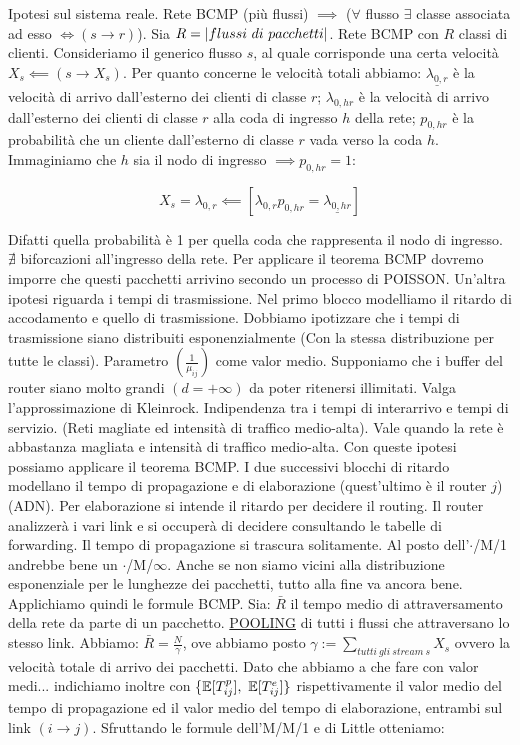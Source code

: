 Ipotesi sul sistema reale. Rete BCMP (più flussi) $\implies$ ($\forall$ flusso $\exists$ classe associata ad esso $\iff (s\rightarrow r)$). Sia $R=\cardinality{flussi\ di\ pacchetti}$. Rete BCMP con $R$ classi di clienti. Consideriamo il generico flusso $s$, al quale corrisponde una certa velocità $X_s \impliedby (s\rightarrow X_s)$. Per quanto concerne le velocità totali abbiamo: $\underline{\lambda_{0,r}}$ è la velocità di arrivo dall'esterno dei clienti di classe $r$; $\lambda_{0,hr}$ è la velocità di arrivo dall'esterno dei clienti di classe $r$ alla coda di ingresso $h$ della rete; $p_{0,hr}$ è la probabilità che un cliente dall'esterno di classe $r$ vada verso la coda $h$. Immaginiamo che $h$ sia il nodo di ingresso $\implies p_{0,hr}=1$:

\[
	X_s=\lambda_{0,r} \impliedby [\lambda_{0,r}p_{0,hr} = \underline{\lambda_{0,hr}}]
\]

Difatti quella probabilità è 1 per quella coda che rappresenta il nodo di ingresso. $\nexists$ biforcazioni all'ingresso della rete. Per applicare il teorema BCMP dovremo imporre che questi pacchetti arrivino secondo un processo di POISSON. Un'altra ipotesi riguarda i tempi di trasmissione. Nel primo blocco modelliamo il ritardo di accodamento e quello di trasmissione. Dobbiamo ipotizzare che i tempi di trasmissione siano distribuiti esponenzialmente (Con la stessa distribuzione per tutte le classi). Parametro $(\frac{1}{\mu_{ij}})$ come valor medio. Supponiamo che i buffer del router siano molto grandi $(d=+\infty)$ da poter ritenersi illimitati. Valga l'approssimazione di Kleinrock. Indipendenza tra i tempi di interarrivo e tempi di servizio. (Reti magliate ed intensità di traffico medio-alta). Vale quando la rete è abbastanza magliata e intensità di traffico medio-alta. Con queste ipotesi possiamo applicare il teorema BCMP. I due successivi blocchi di ritardo modellano il tempo di propagazione e di elaborazione (quest'ultimo è il router $j$) (ADN). Per elaborazione si intende il ritardo per decidere il routing. Il router analizzerà i vari link e si occuperà di decidere consultando le tabelle di forwarding. Il tempo di propagazione si trascura solitamente. Al posto dell'$\mathord{\cdot}$/M/1 andrebbe bene un $\mathord{\cdot}$/M/$\infty$. Anche se non siamo vicini alla distribuzione esponenziale per le lunghezze dei pacchetti, tutto alla fine va ancora bene. Applichiamo quindi le formule BCMP. Sia: $\bar{R}$ il tempo medio di attraversamento della rete da parte di un pacchetto. \underline{POOLING} di tutti i flussi che attraversano lo stesso link. Abbiamo: $\bar{R}=\frac{N}{\gamma}$, ove abbiamo posto $\gamma:=\sum_{tutti\ gli\ stream\ s}{X_s}$ ovvero la velocità totale di arrivo dei pacchetti. Dato che abbiamo a che fare con valor medi... indichiamo inoltre con \{$\operatorname{\mathbb{E}}[T_{ij}^p],\ \operatorname{\mathbb{E}}[T_{ij}^e]\}$ rispettivamente il valor medio del tempo di propagazione ed il valor medio del tempo di elaborazione, entrambi sul link $(i\rightarrow j)$. Sfruttando le formule dell'M/M/1 e di Little otteniamo:

